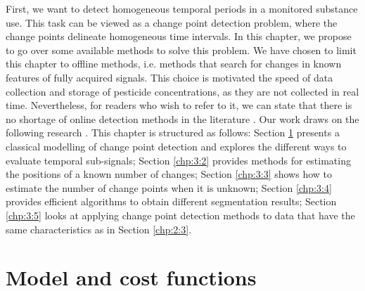 First, we want to detect homogeneous temporal periods in a monitored substance use. This task can be viewed as a change point detection problem, where the change points delineate homogeneous time intervals. In this chapter, we propose to go over some available methods to solve this problem.  
We have chosen to limit this chapter to offline methods, i.e. methods that search for changes in known features of fully acquired signals. This choice is motivated the speed of data collection and storage of pesticide concentrations, as they are not collected in real time. Nevertheless, for readers who wish to refer to it, we can state that there is no shortage of online detection methods in the literature \citep{liu2017change,Li2021,hohle2010online,ranganathan2010pliss,li2015m}.
Our work draws on the following research \citep{truong2020,basseville1993detection,bardet2020}. This chapter is structured as follows: Section \ref{chp:3:1} presents a classical modelling of change point detection and explores the different ways to evaluate temporal sub-signals; Section \ref{chp:3:2} provides methods for estimating the positions of a known number of changes; Section \ref{chp:3:3} shows how to estimate the number of change points when it is unknown; Section \ref{chp:3:4} provides efficient algorithms to obtain different segmentation results; Section \ref{chp:3:5} looks at applying change point detection methods to data that have the same characteristics as in Section \ref{chp:2:3}.

\section{Model and cost functions}\label{chp:3:1}


